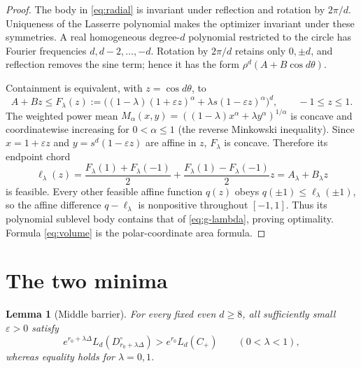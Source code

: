 \documentclass[11pt]{article}
\newtheorem{lemma}{Lemma}
\newcommand{\eps}{\varepsilon}
\begin{document}
\begin{proof}
The body in \eqref{eq:radial} is invariant under reflection and rotation by
$2\pi/d$.  Uniqueness of the Lasserre polynomial makes the optimizer invariant
under these symmetries.  A real homogeneous degree-$d$ polynomial restricted
to the circle has Fourier frequencies $d,d-2,\ldots,-d$.  Rotation by
$2\pi/d$ retains only $0,\pm d$, and reflection removes the sine term; hence
it has the form $\rho^d(A+B\cos d\theta)$.

Containment is equivalent, with $z=\cos d\theta$, to
\begin{equation}\label{eq:minorant}
 A+Bz\leq
 F_\lambda(z):=\bigl((1-\lambda)(1+\eps z)^\alpha
       +\lambda s(1-\eps z)^\alpha\bigr)^d,\qquad -1\leq z\leq1.
\end{equation}
The weighted power mean $M_\alpha(x,y)=((1-\lambda)x^\alpha+\lambda
y^\alpha)^{1/\alpha}$ is concave and coordinatewise increasing for
$0<\alpha\leq1$ (the reverse Minkowski inequality).  Since
$x=1+\eps z$ and $y=s^d(1-\eps z)$ are affine in $z$, $F_\lambda$ is
concave.  Therefore its endpoint chord
\[
 \ell_\lambda(z)=\frac{F_\lambda(1)+F_\lambda(-1)}2
 +\frac{F_\lambda(1)-F_\lambda(-1)}2z
 =A_\lambda+B_\lambda z
\]
is feasible.  Every other feasible affine function $q(z)$ obeys
$q(\pm1)\leq\ell_\lambda(\pm1)$, so the affine difference
$q-\ell_\lambda$ is nonpositive throughout $[-1,1]$.  Thus its polynomial
sublevel body contains that of \eqref{eq:g-lambda}, proving optimality.
Formula \eqref{eq:volume} is the polar-coordinate area formula.
\end{proof}

\section{The two minima}

\begin{lemma}[Middle barrier]\label{lem:barrier}
For every fixed even $d\geq8$, all sufficiently small $\eps>0$ satisfy
\[
 e^{r_0+\lambda\Delta}L_d(D_{r_0+\lambda\Delta}^\circ)
 >e^{r_0}L_d(C_+)\qquad(0<\lambda<1),
\]
whereas equality holds for $\lambda=0,1$.
\end{lemma}
\end{document}
